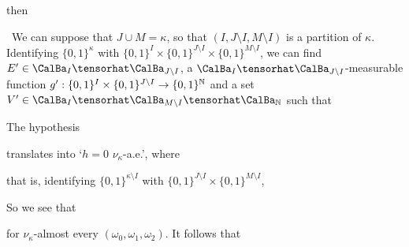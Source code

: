 {

\noindent then


\noindent\Prf\ We can suppose that $J\cup M=\kappa$, so that
$(I,J\setminus I,M\setminus I)$ is a partition of $\kappa$.   Identifying
$\{0,1\}^{\kappa}$ with
$\{0,1\}^I\times\{0,1\}^{J\setminus I}\times\{0,1\}^{M\setminus I}$,
we can find
$E'\in\CalBa_I\tensorhat\CalBa_{J\setminus I}$, a
$\CalBa_I\tensorhat\CalBa_{J\setminus I}$-measurable function
$g':\{0,1\}^I\times\{0,1\}^{J\setminus I}\to\{0,1\}^{\Bbb N}$ and
a set
$V'\in\CalBa_I\tensorhat\CalBa_{M\setminus I}\tensorhat\CalBa_{\Bbb N}$
such that




\noindent The hypothesis


\noindent translates into `$h=0\,\,\nu_{\kappa}$-a.e.', where


\noindent that is, identifying $\{0,1\}^{\kappa\setminus I}$ with
$\{0,1\}^{J\setminus I}\times\{0,1\}^{M\setminus I}$,


\noindent So we see that


\noindent for $\nu_{\kappa}$-almost every $(\omega_0,\omega_1,\omega_2)$.
It follows that


}
